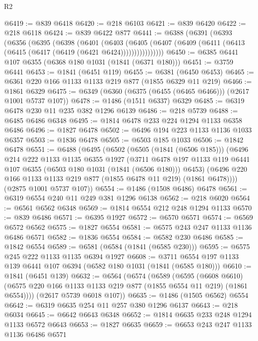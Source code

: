 \begin{lexlean}{R2}
\begin{coremodule}
@6419 := @839 @6418
@6420 := @218 @6103
@6421 := @839 @6420
@6422 := @218 @6118
@6424 := @839 @6422 @877
@6441 := @6388
    (@6391
      (@6393
        (@6356
          (@6395
            (@6398
              (@6401
                (@6403
                  (@6405
                    (@6407 (@6409 (@6411 (@6413 (@6415 (@6417 (@6419 (@6421 @6424))))))))))))))))
@6450 := @6385 @6441 @107 @6355 (@6368 @180 @1031 (@1841 (@6371 @180)))
@6451 := @3759 @6441
@6453 := @1841 (@6451 @119)
@6455 := @6381 (@6450 @6453)
@6465 := @6361 @220 @166 @1133 @1133 @219 @877 (@1855 @6329 @11 @219)
@6466 := @1861 @6329
@6475 := @6349 (@6360 (@6375 (@6455 (@6465 @6466))) (@2617 @1001 @5737 @107))
@6478 := @1486 (@1511 @6337) @6329
@6485 := @6319 @6478 @230 @11 @235 @382 @1296 @6139
@6486 := @218 @5739
@6488 := @6485 @6486 @6348
@6495 := @1814 @6478 @233 @224 @1294 @1133 @6358 @6486
@6496 := @1827 @6478
@6502 := @6496 @194 @223 @1133 @1136 @1033 @6357
@6503 := @1836 @6478
@6505 := @6503 @185 @1033
@6506 := @1842 @6478
@6551 := @6488
    (@6495
      (@6502
        (@6505 (@1841 (@6506 @185)))
        (@6496
          @214
          @222
          @1133
          @1135
          @6355
          @1927
          (@3711
            @6478
            @197
            @1133
            @119
            @6441
            @107
            @6355
            (@6503 @180 @1031 (@1841 (@6506 @180)))
            @6453)
          (@6496 @220 @166 @1133 @1133 @219 @877 (@1855 @6478 @11 @219) (@1861 @6478))))
      (@2875 @1001 @5737 @107))
@6554 := @1486 (@1508 @6486) @6478
@6561 := @6319 @6554 @240 @11 @249 @381 @1296 @6138
@6562 := @218 @6020
@6564 := @6561 @6562 @6348
@6569 := @1814 @6554 @212 @248 @1294 @1133
@6570 := @839 @6486
@6571 := @6395 @1927
@6572 := @6570 @6571
@6574 := @6569 @6572 @6562
@6575 := @1827 @6554
@6581 := @6575 @243 @247 @1133 @1136 @6486 @6571
@6582 := @1836 @6554
@6584 := @6582 @230 @6486
@6585 := @1842 @6554
@6589 := @6581 (@6584 (@1841 (@6585 @230)))
@6595 := @6575 @245 @222 @1133 @1135 @6394 @1927
@6608 := @3711 @6554 @197 @1133 @139 @6441 @107 @6394 (@6582 @180 @1031 (@1841 (@6585 @180)))
@6610 := @1841 (@6451 @139)
@6632 := @6564
    (@6574
      (@6589
        (@6595
          (@6608 @6610)
          (@6575 @220 @166 @1133 @1133 @219 @877 (@1855 @6554 @11 @219) (@1861 @6554))))
      (@2617 @5739 @6018 @107))
@6635 := @1486 (@1505 @6562) @6554
@6642 := @6319 @6635 @254 @11 @257 @380 @1296 @6137
@6643 := @218 @6034
@6645 := @6642 @6643 @6348
@6652 := @1814 @6635 @233 @248 @1294 @1133 @6572 @6643
@6653 := @1827 @6635
@6659 := @6653 @243 @247 @1133 @1136 @6486 @6571

\end{coremodule}
\end{lexlean}
